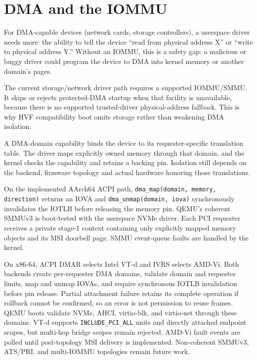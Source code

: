 \section{DMA and the IOMMU}

For DMA-capable devices (network cards, storage controllers), a userspace
driver needs more: the ability to tell the device ``read from physical address
X'' or ``write to physical address Y.'' Without an IOMMU, this is a safety
gap: a malicious or buggy driver could program the device to DMA into kernel
memory or another domain's pages.

The current storage/network driver path requires a supported IOMMU/SMMU.
It skips or rejects protected-DMA startup when that facility is unavailable, because
there is no supported trusted-driver physical-address fallback. This is why
HVF compatibility boot omits storage rather than weakening DMA isolation.

A DMA-domain capability binds the device to its requester-specific translation
table. The driver maps explicitly owned memory through that domain, and the kernel
checks the capability and retains a backing pin. Isolation still depends on the
backend, firmware topology and actual hardware honoring those translations.

On the implemented AArch64 ACPI path, \texttt{dma\_map(domain, memory,
direction)} returns an IOVA and \texttt{dma\_unmap(domain, iova)}
synchronously invalidates the IOTLB before releasing the memory pin. QEMU's
coherent SMMUv3 is boot-tested with the userspace NVMe driver. Each PCI
requester receives a private stage-1 context containing only explicitly mapped
memory objects and its MSI doorbell page. SMMU event-queue faults are handled
by the kernel.

On x86-64, ACPI DMAR selects Intel VT-d and IVRS selects AMD-Vi. Both backends
create per-requester DMA domains, validate domain and requester limits, map and
unmap IOVAs, and require synchronous IOTLB invalidation before pin release.
Partial attachment failure retains its complete operation if rollback cannot
be confirmed, so an error is not permission to reuse frames. QEMU boots validate NVMe,
AHCI, virtio-blk, and virtio-net through these domains. VT-d supports
\texttt{INCLUDE\_PCI\_ALL} units and directly attached endpoint scopes, but
multi-hop bridge scopes remain rejected. AMD-Vi fault events are polled until
post-topology MSI delivery is implemented. Non-coherent SMMUv3, ATS/PRI, and
multi-IOMMU topologies remain future work.

